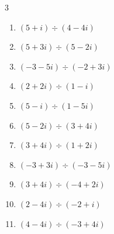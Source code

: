 \begin{multicols}{3}
\begin{enumerate}

  \item $\displaystyle (5+i)\div(4-4i)$


  \item $\displaystyle (5+3i)\div(5-2i)$


  \item $\displaystyle (-3-5i)\div(-2+3i)$


\columnbreak %

  \item $\displaystyle (2+2i)\div(1-i)$

        \phantom{$\displaystyle =2i$}

  \item $\displaystyle (5-i)\div(1-5i)$


  \item $\displaystyle (5-2i)\div(3+4i)$


  \item $\displaystyle (3+4i)\div(1+2i)$


  \item $\displaystyle (-3+3i)\div(-3-5i)$


  \item $\displaystyle (3+4i)\div(-4+2i)$


  \item $\displaystyle (2-4i)\div(-2+i)$


  \item $\displaystyle (4-4i)\div(-3+4i)$



\end{enumerate}
\end{multicols}
